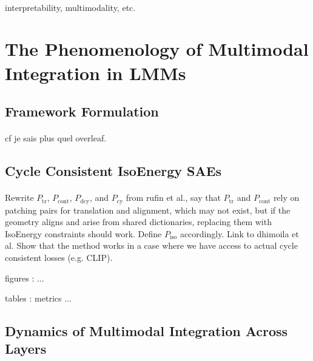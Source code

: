 \documentclass{article}
\begin{document}
\paragraph{}interpretability, multimodality, etc.

\section{The Phenomenology of Multimodal Integration in LMMs}

\subsection{Framework Formulation}

\paragraph{}cf je sais plus quel overleaf.

\subsection{Cycle Consistent IsoEnergy SAEs}

\paragraph{}Rewrite $P_{\mathrm{tr}}$, $P_{\mathrm{cont}}$, $P_{\mathrm{dcy}}$, and $P_{\mathrm{cy}}$ from rufin et al., say that $P_{\mathrm{tr}}$ and $P_{\mathrm{cont}}$ rely on patching pairs for translation and alignment, which may not exist, but if the geometry aligns and arise from shared dictionaries, replacing them with IsoEnergy constraints should work. Define $P_{\mathrm{iso}}$ accordingly. Link to dhimoila et al. Show that the method works in a case where we have access to actual cycle consistent losses (e.g. CLIP).

figures : ...

tables : metrics ...

\subsection{Dynamics of Multimodal Integration Across Layers}
\end{document}
